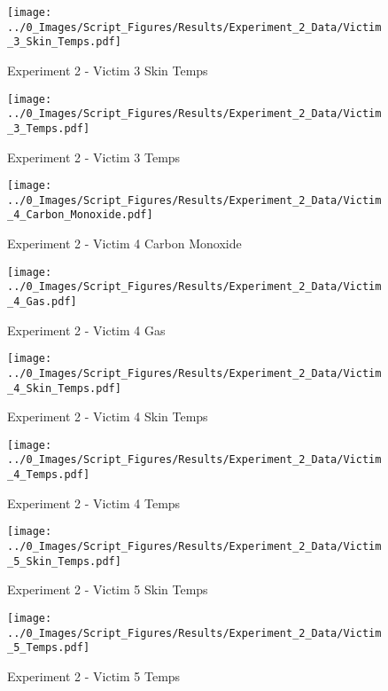 	\begin{figure}[H]
		\centering
		\texttt{[image: ../0\_Images/Script\_Figures/Results/Experiment\_2\_Data/Victim\_3\_Skin\_Temps.pdf]}
		\caption[]{Experiment 2 - Victim 3 Skin Temps}
	\end{figure}
 
	\clearpage

	\begin{figure}[H]
		\centering
		\texttt{[image: ../0\_Images/Script\_Figures/Results/Experiment\_2\_Data/Victim\_3\_Temps.pdf]}
		\caption[]{Experiment 2 - Victim 3 Temps}
	\end{figure}
 

	\begin{figure}[H]
		\centering
		\texttt{[image: ../0\_Images/Script\_Figures/Results/Experiment\_2\_Data/Victim\_4\_Carbon\_Monoxide.pdf]}
		\caption[]{Experiment 2 - Victim 4 Carbon Monoxide}
	\end{figure}
 
	\clearpage

	\begin{figure}[H]
		\centering
		\texttt{[image: ../0\_Images/Script\_Figures/Results/Experiment\_2\_Data/Victim\_4\_Gas.pdf]}
		\caption[]{Experiment 2 - Victim 4 Gas}
	\end{figure}
 

	\begin{figure}[H]
		\centering
		\texttt{[image: ../0\_Images/Script\_Figures/Results/Experiment\_2\_Data/Victim\_4\_Skin\_Temps.pdf]}
		\caption[]{Experiment 2 - Victim 4 Skin Temps}
	\end{figure}
 
	\clearpage

	\begin{figure}[H]
		\centering
		\texttt{[image: ../0\_Images/Script\_Figures/Results/Experiment\_2\_Data/Victim\_4\_Temps.pdf]}
		\caption[]{Experiment 2 - Victim 4 Temps}
	\end{figure}
 

	\begin{figure}[H]
		\centering
		\texttt{[image: ../0\_Images/Script\_Figures/Results/Experiment\_2\_Data/Victim\_5\_Skin\_Temps.pdf]}
		\caption[]{Experiment 2 - Victim 5 Skin Temps}
	\end{figure}
 
	\clearpage

	\begin{figure}[H]
		\centering
		\texttt{[image: ../0\_Images/Script\_Figures/Results/Experiment\_2\_Data/Victim\_5\_Temps.pdf]}
		\caption[]{Experiment 2 - Victim 5 Temps}
	\end{figure}
 

